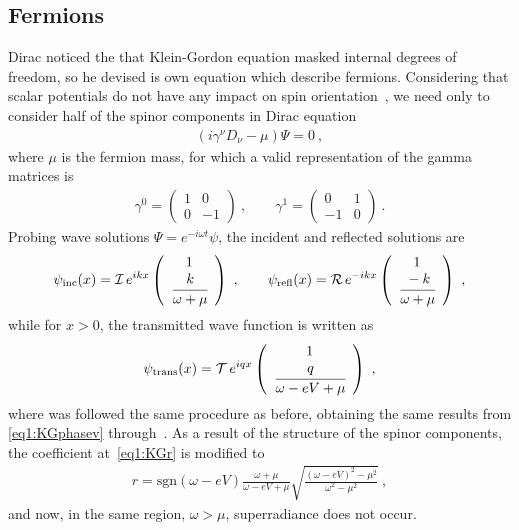 \subsection{Fermions}

Dirac noticed the that Klein-Gordon equation masked internal degrees of freedom, so he devised is own equation which describe fermions.
Considering that scalar potentials do not have any impact on spin orientation~\cite{Itzykson2012}, we need only to consider half of the spinor components in Dirac equation
\begin{align}
    ( i \gamma^\nu D_\nu - \mu ) \Psi = 0 ~,
    \label{eq1:Dirac}
\end{align}
where $\mu$ is the fermion mass, for which a valid representation of the gamma matrices is
\begin{align}
    \gamma^0 = \left(\begin{array}{cr} 1 & 0 \\  0 & -1 \end{array}\right) ~,\qquad 
    \gamma^1 = \left(\begin{array}{cr} 0 & 1 \\ -1 &  0 \end{array}\right) ~.
    \label{eq1:Gamma1+1}
\end{align}
Probing wave solutions $\Psi= e^{-i\omega t} \psi$, the incident and reflected solutions are
\begin{align}
    \psi_\mathrm{inc}(x) = \mathcal{I}\, e^{i k x} \left(\begin{array}{c} 1 \\ \cfrac{k}{\omega+\mu} \end{array}\right) ~,\qquad
    \psi_\mathrm{refl}(x) = \mathcal{R}\, e^{- i k x} \left(\begin{array}{c} 1 \\ \cfrac{-k}{\omega+\mu} \end{array}\right) ~,
    \label{eq1:Diracsolneg}   
\end{align}
while for $x>0$, the transmitted wave function is written as 
\begin{align}
    \psi_\mathrm{trans}(x) = \mathcal{T}\, e^{i q x} \left(\begin{array}{c} 1 \\ \cfrac{q}{ \omega - e V + \mu} \end{array}\right) ~,
    \label{eq1:Diracsolpos} 
\end{align}
where was followed the same procedure as before, obtaining the same results from \eqref{eq1:KGphasev} through~. 
As a result of the structure of the spinor components, the coefficient at~\eqref{eq1:KGr} is modified to
\begin{align}
    r = \mathrm{sgn}(\omega - e V) \frac{\omega+\mu}{\omega-e V+\mu} \sqrt{\frac{(\omega - e V)^2 - \mu^2}{\omega^2 - \mu^2}} ~,
    \label{eq1:Diracr} 
\end{align}
and now, in the same region, $\omega > \mu$, superradiance does not occur.

